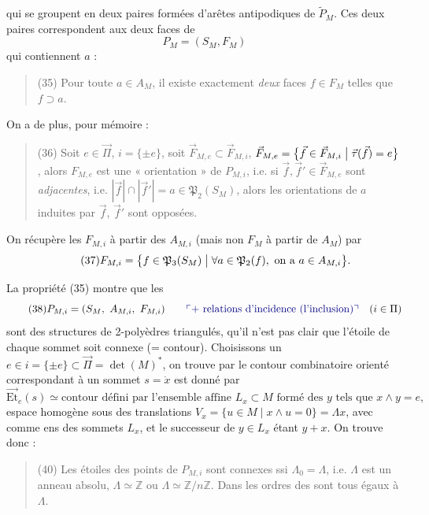 \documentclass[11pt,a4paper]{article}
\begin{document}
qui se groupent en deux paires  \struck{\ill{}} formées d'arêtes
antipodiques de $\widetilde{P}_M$. Ces deux paires correspondent aux deux faces de
\add{\ill{}}
\[
P_M = (S_M, F_M)
\]
qui contiennent $a$ :
\begin{quote}
(35) Pour toute $a\in A_M$, il existe exactement \emph{deux} faces $f\in F_M$ telles
que $f\supset a$.
\end{quote}
On a de plus, pour mémoire :
\begin{quote}
(36) Soit $e\in\vec{\Pi}$, $i=\{\pm e\}$, soit
$\vec{F}_{M,e}\subset\vec{F}_{M,i}$,
$\vec{F}_{M,e} = \bigl\{\vec f\in\vec{F}_{M,i} \bigm| \vec{\tau}(\vec f) = e\bigr\}$,
alors $F_{M,e}$ est une « orientation » de $P_{M,i}$, i.e. si
$\vec f,\vec f'\in\vec{F}_{M,e}$ sont \emph{adjacentes}, i.e.
$|\vec f|\cap|\vec f'| = a\in\mathfrak{P}_2(S_M)$, alors les orientations de $a$
induites par $\vec f$, $\vec f'$ sont opposées.
\end{quote}
On récupère les $F_{M,i}$ à partir des $A_{M,i}$ (mais non $F_M$ à partir de $A_M$) par
\[
\tag{37}
F_{M,i} = \bigl\{ f\in\mathfrak{P}_3(S_M) \bigm| \forall a\in\mathfrak{P}_2(f),\ \text{on a } a\in A_{M,i}\bigr\}.
\]

La propriété (35) montre que les 
\[
\tag{38}
P_{M,i} = (S_M,\ A_{M,i},\ F_{M,i})
\qquad \text{\add{+ relations d'incidence (l'inclusion)}}\quad (i\in\Pi)
\]
sont des structures de 2-polyèdres triangulés,  qu'il n'est pas clair que
l'étoile de chaque sommet soit connexe (= contour). Choisissons un
$e\in i = \{\pm e\}\subset\vec{\Pi} = \det(M)^{*}$, on trouve par le contour combinatoire
orienté correspondant à un sommet $s=\dot x$ est donné par
\[
\tag{39}
\vec{\mathrm{Et}}_e(s) \simeq \text{contour défini par l'ensemble affine } L_x\subset M
\text{ formé des } y \text{ tels que } x\wedge y = e,
\]
espace homogène sous des translations $V_x = \{u\in M \mid x\wedge u = 0\} = \Lambda x$,
avec comme ens des sommets $L_x$, et le successeur de $y\in L_x$ étant
$y+x$.
On trouve donc :
\begin{quote}
(40) Les étoiles des points de $P_{M,i}$ sont connexes ssi $\Lambda_0=\Lambda$, i.e.
$\Lambda$ est un anneau absolu, $\Lambda\simeq\mathbb{Z}$ ou
$\Lambda\simeq\mathbb{Z}/n\mathbb{Z}$. Dans   les
ordres des \struck{\ill{}}  sont tous égaux à  $\Lambda$.
\end{quote}
\end{document}
